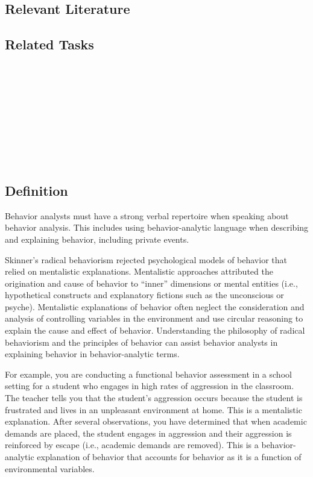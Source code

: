 \subsection{Relevant Literature}
\begin{refsection}
\nocite{bailey1991marketing,
        lindsley1991technical,
        malott1992should}
\printbibliography[heading=none]
\end{refsection}
\subsection{Related Tasks}
\fourgSix{}\\
\fouriSix{}\\
\fourjSix{}\\
\fourjSeven{}\\
\fourkOne{}\\
\fourkThree{}\\
\fourkEight{}\\
\fourkNine{}\\
%
\clearpage \section[\fourgFive{}]{\fourgFive{}%
              }
\subsection{Definition}
Behavior analysts must have a strong verbal repertoire when speaking about behavior analysis.  This includes using behavior-analytic language when describing and explaining behavior, including private events.  

Skinner's radical behaviorism rejected psychological models of behavior that relied on mentalistic explanations. Mentalistic approaches attributed the origination and cause of behavior to ``inner'' dimensions or mental entities (i.e., hypothetical constructs and explanatory fictions such as the unconscious or psyche).  Mentalistic explanations of behavior often neglect the consideration and analysis of controlling variables in the environment and use circular reasoning to explain the cause and effect of behavior.  Understanding the philosophy of radical behaviorism and the principles of behavior can assist behavior analysts in explaining behavior in behavior-analytic terms.

For example, you are conducting a functional behavior assessment in a school setting for a student who engages in high rates of aggression in the classroom.  The teacher tells you that the student's aggression occurs because the student is frustrated and lives in an unpleasant environment at home.  This is a mentalistic explanation.  After several observations, you have determined that when academic demands are placed, the student engages in aggression and their aggression is reinforced by escape (i.e., academic demands are removed). This is a behavior-analytic explanation of behavior that accounts for behavior as it is a function of environmental variables.  

